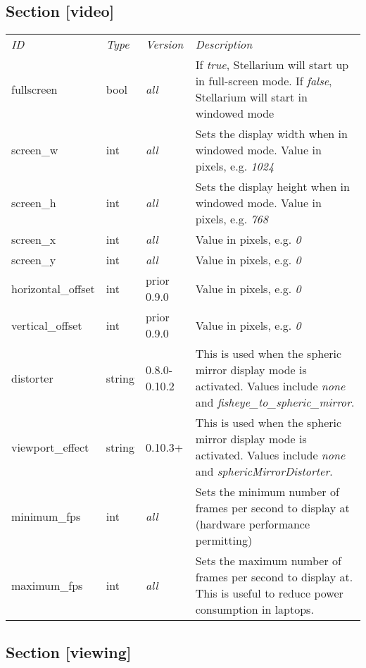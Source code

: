 \subsection{Section {[}video{]}}\label{section-video}

\begin{longtable}[c]{@{}llll@{}}
\toprule
\emph{ID} & \emph{Type} & \emph{Version} &
\emph{Description}\tabularnewline
fullscreen & bool & \emph{all} & If \emph{true}, Stellarium will start
up in full-screen mode. If \emph{false}, Stellarium will start in
windowed mode\tabularnewline
screen\_w & int & \emph{all} & Sets the display width when in windowed
mode. Value in pixels, e.g. \emph{1024}\tabularnewline
screen\_h & int & \emph{all} & Sets the display height when in windowed
mode. Value in pixels, e.g. \emph{768}\tabularnewline
screen\_x & int & \emph{all} & Value in pixels, e.g.
\emph{0}\tabularnewline
screen\_y & int & \emph{all} & Value in pixels, e.g.
\emph{0}\tabularnewline
horizontal\_offset & int & prior 0.9.0 & Value in pixels, e.g.
\emph{0}\tabularnewline
vertical\_offset & int & prior 0.9.0 & Value in pixels, e.g.
\emph{0}\tabularnewline
distorter & string & 0.8.0-0.10.2 & This is used when the spheric mirror
display mode is activated. Values include \emph{none} and
\emph{fisheye\_to\_spheric\_mirror}.\tabularnewline
viewport\_effect & string & 0.10.3+ & This is used when the spheric
mirror display mode is activated. Values include \emph{none} and
\emph{sphericMirrorDistorter}.\tabularnewline
minimum\_fps & int & \emph{all} & Sets the minimum number of frames per
second to display at (hardware performance permitting)\tabularnewline
maximum\_fps & int & \emph{all} & Sets the maximum number of frames per
second to display at. This is useful to reduce power consumption in
laptops.\tabularnewline
\bottomrule
\end{longtable}

\subsection{Section {[}viewing{]}}\label{section-viewing}

